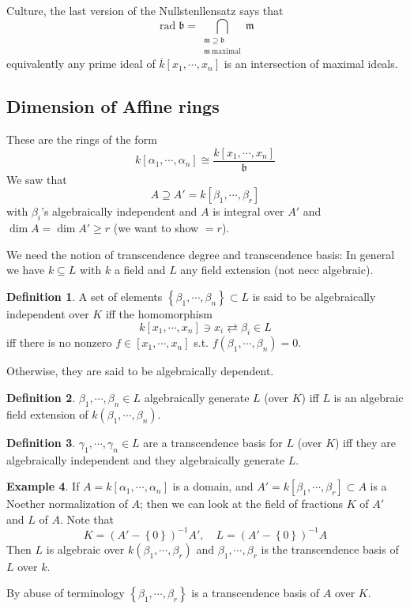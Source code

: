 \documentclass[11pt,a4paper]{article}
\theoremstyle{definition}
\newtheorem{definition}{Definition}[section]
\newtheorem{example}[definition]{Example}
\theoremstyle{plain}
\theoremstyle{remark}
\renewcommand{\set}[1]{\left\{ #1 \right\}}
\newcommand{\rad}{\operatorname{rad}}
\begin{document}
Culture, the last version of the Nullstenllensatz says that 
$$\rad \mathfrak{b} = \bigcap_{\substack{\mathfrak{m} \supseteq \mathfrak{b} \\ \mathfrak{m} \ \text{maximal}}} \mathfrak{m}$$
equivalently any prime ideal of $\overline{k}[x_1, \cdots, x_n]$ is an intersection of maximal ideals. 

\subsection{Dimension of Affine rings}
These are the rings of the form 
$$k[\alpha_1, \cdots, \alpha_n] \cong \frac{k[x_1, \cdots, x_n]}{\mathfrak{b}}$$
We saw that 
$$A \supseteq A' = k[\beta_1, \cdots, \beta_r]$$
with $\beta_i$'s algebraically independent and $A$ is integral over $A'$ and $\dim A = \dim A' \ge r$ (we want to show $=r$). 

We need the notion of transcendence degree and transcendence basis: In general we have $k \subseteq L$ with $k$ a field and $L$ any field extension 
(not necc algebraic). 
\begin{definition}
    A set of elements $\set{\beta_1, \cdots, \beta_n} \subset L$ is said to be algebraically independent over $K$ iff the homomorphism 
    $$k[x_1, \cdots, x_n] \ni x_i \rightleftarrows \beta_i \in L$$
    iff there is no nonzero $f \in [x_1, \cdots, x_n]$ s.t. $f(\beta_1, \cdots, \beta_n) = 0$. 

    Otherwise, they are said to be algebraically dependent.
\end{definition}

\begin{definition}
    $\beta_1, \cdots, \beta_n \in L$ algebraically generate $L$ (over $K$) iff $L$ is an algebraic field extension of $k(\beta_1, \cdots, \beta_n)$. 
\end{definition}

\begin{definition}
    $\gamma_1, \cdots, \gamma_n \in L$ are a transcendence basis for $L$ (over $K$) iff they are algebraically independent and they algebraically generate $L$.  
\end{definition}

\begin{example}
    If $A = k[\alpha_1, \cdots, \alpha_n]$ is a domain, and $A' = k[\beta_1, \cdots, \beta_r] \subset A$ is a Noether normalization of 
    $A$; then we can look at the field of fractions $K$ of $A'$ and $L$ of $A$. Note that 
    $$K = (A'-\set{0})^{-1} A', \quad L = (A'-\set{0})^{-1} A$$
    Then $L$ is algebraic over $k(\beta_1, \cdots, \beta_r)$ and $\beta_1, \cdots, \beta_r$ is the transcendence basis of $L$ over $k$.

    By abuse of terminology $\set{\beta_1, \cdots, \beta_r}$ is a transcendence basis of $A$ over $K$.
\end{example}
\end{document}
